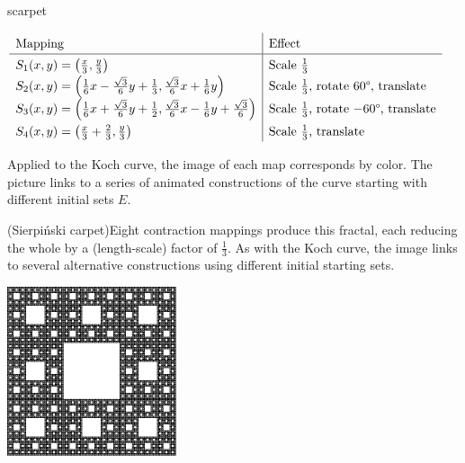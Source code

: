 \begin{examples}{}{scarpet}
\begin{enumerate}
$\renewcommand\arraystretch{1.4}
\begin{array}{l|l}
\text{Mapping}&\text{Effect}\\\hline
\displaystyle S_1(x,y)=\left(\tfrac x3,\tfrac y3\right)&\text{Scale $\frac 13$}\\
\displaystyle S_2(x,y)=\left(\tfrac 16x-\tfrac{\sqrt 3}6y+\tfrac 13,\tfrac{\sqrt 3}6x+\tfrac 16y\right) &\text{Scale $\frac 13$, rotate \ang{60}, translate}\\
\displaystyle S_3(x,y)=\left(\tfrac 16x+\tfrac{\sqrt 3}6y+\tfrac 12,\tfrac{\sqrt 3}6x-\tfrac 16y+\tfrac{\sqrt 3}6\right) &\text{Scale $\frac 13$, rotate $-\ang{60}$, translate}\\
\displaystyle S_4(x,y)=\left(\tfrac x3+\tfrac 23,\tfrac y3\right) &\text{Scale $\frac 13$, translate}
\end{array}$\par
Applied to the Koch curve, the image of each map corresponds by color. The picture links to a series of animated constructions of the curve starting with different initial sets $E$.

\begin{minipage}[t]{0.72\linewidth}\vspace{0pt}
	\item (Sierpiński carpet)\lstsp Eight contraction mappings produce this fractal, each reducing the whole by a (length-scale) factor of $\frac 13$.\smallbreak
As with the Koch curve, the image links to several alternative constructions using different initial starting sets.
\end{minipage}
\hfill
\begin{minipage}[t]{0.27\linewidth}\vspace{0pt}
	\flushright \href{http://www.math.uci.edu/~ndonalds/math161/sier-anim.html}{\includegraphics[scale=1]{sieranim2}}
\end{minipage}\par



\end{enumerate}
\end{examples}
